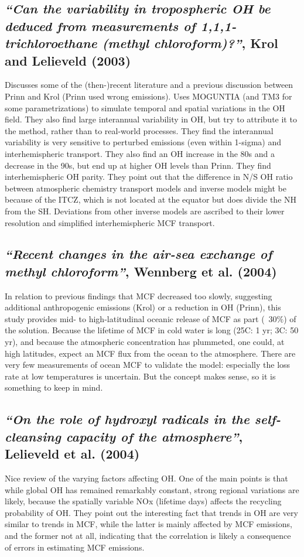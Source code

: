 \documentclass{article}
\begin{document}
\subsection{\textit{“Can the variability in tropospheric OH be deduced from measurements of 1,1,1-trichloroethane (methyl chloroform)?”}, Krol and Lelieveld (2003)}
Discusses some of the (then-)recent literature and a previous discussion between Prinn and Krol (Prinn used wrong emissions). Uses MOGUNTIA (and TM3 for some parametrizations) to simulate temporal and spatial variations in the OH field. They also find large interannual variability in OH, but try to attribute it to the method, rather than to real-world processes. They find the interannual variability is very sensitive to perturbed emissions (even within 1-sigma) and interhemispheric transport.
They also find an OH increase in the 80s and a decrease in the 90s, but end up at higher OH levels than Prinn. They find interhemispheric OH parity. They point out that the difference in N/S OH ratio between atmospheric chemistry transport models and inverse models might be because of the ITCZ, which is not located at the equator but does divide the NH from the SH. Deviations from other inverse models are ascribed to their lower resolution and simplified interhemispheric MCF transport.

\subsection{\textit{“Recent changes in the air-sea exchange of methyl chloroform”}, Wennberg et al. (2004)}
In relation to previous findings that MCF decreased too slowly, suggesting additional anthropogenic emissions (Krol) or a reduction in OH (Prinn), this study provides mid- to high-latitudinal oceanic release of MCF as part (~30$\%$) of the solution. Because the lifetime of MCF in cold water is long (25C: 1 yr; 3C: 50 yr), and because the atmospheric concentration has plummeted, one could, at high latitudes, expect an MCF flux from the ocean to the atmosphere. There are very few measurements of ocean MCF to validate the model: especially the loss rate at low temperatures is uncertain. But the concept makes sense, so it is something to keep in mind.

\subsection{\textit{“On the role of hydroxyl radicals in the self-cleansing capacity of the atmosphere”}, Lelieveld et al. (2004)}
Nice review of the varying factors affecting OH. One of the main points is that while global OH has remained remarkably constant, strong regional variations are likely, because the spatially variable NOx (lifetime days) affects the recycling probability of OH. They point out the interesting fact that trends in OH are very similar to trends in MCF, while the latter is mainly affected by MCF emissions, and the former not at all, indicating that the correlation is likely a consequence of errors in estimating MCF emissions.
\end{document}
